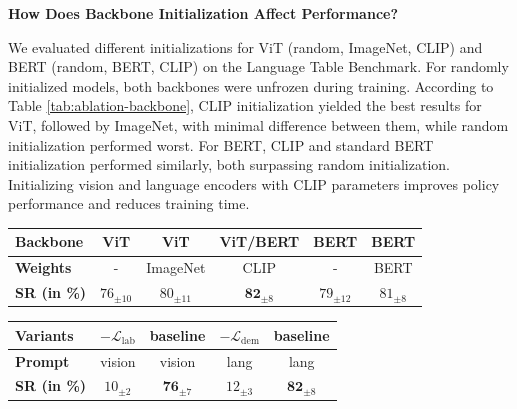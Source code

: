 \noindent \textbf{How Does Backbone Initialization Affect Performance?}

We evaluated different initializations for ViT (random, ImageNet, CLIP) and BERT (random, BERT, CLIP) on the Language Table Benchmark. For randomly initialized models, both backbones were unfrozen during training. According to Table \ref{tab:ablation-backbone}, CLIP initialization yielded the best results for ViT, followed by ImageNet, with minimal difference between them, while random initialization performed worst. For BERT, CLIP and standard BERT initialization performed similarly, both surpassing random initialization. 
Initializing vision and language encoders with CLIP parameters improves policy performance and reduces training time. 


\noindent 
\begin{minipage}[t]{0.55\textwidth} 
\footnotesize
\centering
\setlength{\tabcolsep}{0.9 mm}
\begin{tabular}{@{}lccccc@{}}
\toprule
\textbf{Backbone}     & ViT           & ViT           & ViT/BERT    & BERT          & BERT         \\ \midrule
\textbf{Weights}      & -        & ImageNet      & CLIP        & -        & BERT     \\
\textbf{SR (in \%)} & $76_{\pm 10}$ & $80_{\pm 11}$ & $\mathbf{82}_{\pm 8}$ & $79_{\pm 12}$ & $81_{\pm 8}$ \\ \bottomrule
\end{tabular}
 \label{tab:ablation-backbone}
\end{minipage}%
\hfill 
\begin{minipage}[t]{0.45\textwidth} 
\footnotesize
\centering
\setlength{\tabcolsep}{0.9 mm}
\begin{tabular}{@{}lcccc@{}}
\toprule
\textbf{Variants}    & $-\mathcal{L}_{\text{lab}}$ & baseline                    & $-\mathcal{L}_\text{dem}$ & baseline                    \\ \midrule
\textbf{Prompt} & vision                                        & vision                      & lang                                          & lang                        \\
\textbf{SR (in \%)}      & $10_{\pm 2}$                   & $\mathbf{76}_{\pm 7}$ & $12_{\pm 3}$    & $\mathbf{82}_{\pm 8}$ \\ \bottomrule
\end{tabular}

 \label{tab:ablation-objectives}
\end{minipage}



